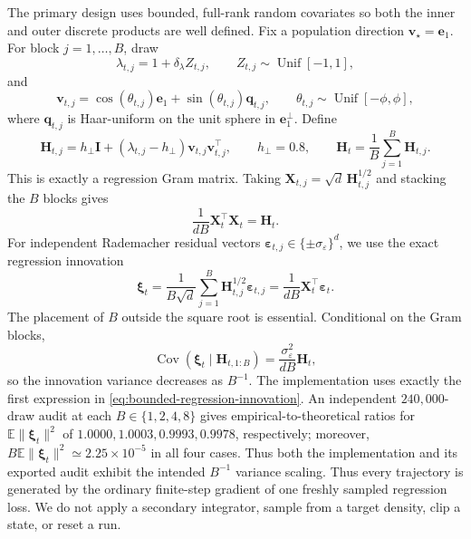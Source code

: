 \documentclass[11pt]{article}
\theoremstyle{definition}
\newcommand{\E}{\mathbb E}
\newcommand{\Id}{\mathbf I}
\newcommand{\vvec}{\mathbf v}
\newcommand{\Hvec}{\mathbf H}
\newcommand{\xivec}{\boldsymbol\xi}
\begin{document}
The primary design uses bounded, full-rank random covariates so both the
inner and outer discrete products are well defined.  Fix a population
direction $\vvec_\star=\mathbf e_1$.  For block $j=1,\ldots,B$, draw
\begin{equation}
 \lambda_{t,j}=1+\delta_\lambda Z_{t,j},\qquad
 Z_{t,j}\sim\operatorname{Unif}[-1,1],
 \label{eq:random-eigenvalue}
\end{equation}
and
\begin{equation}
 \vvec_{t,j}=\cos(\theta_{t,j})\mathbf e_1
 +\sin(\theta_{t,j})\mathbf q_{t,j},
 \qquad \theta_{t,j}\sim\operatorname{Unif}[-\phi,\phi],
 \label{eq:random-direction}
\end{equation}
where $\mathbf q_{t,j}$ is Haar-uniform on the unit sphere in
$\mathbf e_1^\perp$.  Define
\begin{equation}
 \Hvec_{t,j}=h_\perp\Id+
 (\lambda_{t,j}-h_\perp)\vvec_{t,j}\vvec_{t,j}^\top,
 \qquad h_\perp=0.8,
 \qquad
 \Hvec_t=\frac1B\sum_{j=1}^B\Hvec_{t,j}.
 \label{eq:bounded-random-hessian}
\end{equation}
This is exactly a regression Gram matrix.  Taking
$\mathbf X_{t,j}=\sqrt d\,\Hvec_{t,j}^{1/2}$ and stacking the $B$ blocks gives
\begin{equation}
 \frac1{dB}\mathbf X_t^\top\mathbf X_t=\Hvec_t.
 \label{eq:exact-gram-realization}
\end{equation}
For independent Rademacher residual vectors
$\boldsymbol\varepsilon_{t,j}\in\{\pm\sigma_\varepsilon\}^d$, we use the
exact regression innovation
\begin{equation}
 \xivec_t=\frac{1}{B\sqrt d}\sum_{j=1}^B
 \Hvec_{t,j}^{1/2}\boldsymbol\varepsilon_{t,j}
 =\frac1{dB}\mathbf X_t^\top\boldsymbol\varepsilon_t.
 \label{eq:bounded-regression-innovation}
\end{equation}
The placement of $B$ outside the square root is essential.  Conditional on
the Gram blocks,
\[
 \operatorname{Cov}(\xivec_t\mid\Hvec_{t,1:B})
 =\frac{\sigma_\varepsilon^2}{dB}\Hvec_t,
\]
so the innovation variance decreases as $B^{-1}$.  The implementation uses
exactly the first expression in \eqref{eq:bounded-regression-innovation}.
An independent $240{,}000$-draw audit at each $B\in\{1,2,4,8\}$ gives
empirical-to-theoretical ratios for $\E\|\xivec_t\|^2$ of
$1.0000,1.0003,0.9993,0.9978$, respectively; moreover,
$B\E\|\xivec_t\|^2\simeq2.25\times10^{-5}$ in all four cases.  Thus both the
implementation and its exported audit exhibit the intended $B^{-1}$ variance
scaling.
Thus every trajectory is generated by the ordinary finite-step gradient of
one freshly sampled regression loss.  We do not apply a secondary integrator,
sample from a target density, clip a state, or reset a run.
\end{document}
